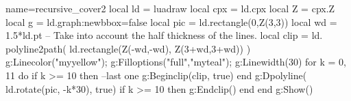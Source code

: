 \documentclass[tikz,border=5pt]{standalone}
\begin{document}
\begin{luadraw}{name=recursive_cover2}
local ld = luadraw
local cpx = ld.cpx
local Z = cpx.Z
local g = ld.graph:new{bbox=false}
local pic = ld.rectangle(0,Z(3,3))
local wd = 1.5*ld.pt -- Take into account the half thickness of the lines.
local clip = ld. polyline2path( ld.rectangle(Z(-wd,-wd), Z(3+wd,3+wd)) )
g:Linecolor("myyellow"); g:Filloptions("full","myteal"); g:Linewidth(30)
for k = 0, 11 do
    if k >= 10 then --last one
        g:Beginclip(clip, true)
    end
    g:Dpolyline( ld.rotate(pic, -k*30), true)
    if k >= 10 then g:Endclip() end
end
g:Show()
\end{luadraw}
\end{document}
